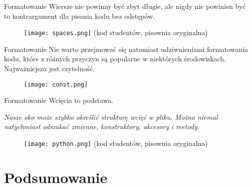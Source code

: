 \begin{frame}{Formatowanie}
	Wiersze nie powinny być zbyt długie, ale nigdy nie powinien być to kontrargument dla pisania kodu bez odstępów.
\end{frame}

\begin{frame}
	\begin{figure} \centering
		\texttt{[image: spaces.png]}
		\footnotesize{(kod studentów, pisownia oryginalna)}
	\end{figure}
\end{frame}

\begin{frame}{Formatowanie}
	Nie warto przejmować się natomiast udziwnieniami formatowania kodu, które z różnych przyczyn są popularne w niektórych środowiskach. Najważniejsza jest czytelność.
\end{frame}

\begin{frame}
	\begin{figure} \centering
		\texttt{[image: const.png]}
	\end{figure}
\end{frame}

\begin{frame}{Formatowanie}
	Wcięcia to podstawa. 
	
	\emph{Nasze oko może szybko określić strukturę wcięć w pliku. Można niemal natychmiast odszukać zmienne, konstruktory, akcesory i metody.}
\end{frame}

\begin{frame}
	\begin{figure} \centering
		\texttt{[image: python.png]}
		\footnotesize{(kod studentów, pisownia oryginalna)}
	\end{figure}
\end{frame}

\section{Podsumowanie}


